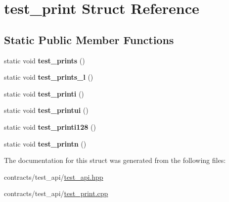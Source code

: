 \hypertarget{structtest__print}{}\section{test\+\_\+print Struct Reference}
\label{structtest__print}
\subsection*{Static Public Member Functions}
\begin{DoxyCompactItemize}
\item 
\mbox{\label{structtest__print_aa69968f94a66e14264afaa33d10fbd0e}} 
static void {\bfseries test\+\_\+prints} ()
\item 
\mbox{\label{structtest__print_af04966b7e8576254aa0cbb1d937a7c73}} 
static void {\bfseries test\+\_\+prints\+\_\+l} ()
\item 
\mbox{\label{structtest__print_a9e304b05c2dbc4df68602804e54a773a}} 
static void {\bfseries test\+\_\+printi} ()
\item 
\mbox{\label{structtest__print_a36ae19ddecc3f36b29ea206944f0f127}} 
static void {\bfseries test\+\_\+printui} ()
\item 
\mbox{\label{structtest__print_abcb55d27afec916e1432284eb6323205}} 
static void {\bfseries test\+\_\+printi128} ()
\item 
\mbox{\label{structtest__print_ab8e13806e7f706d7d08edf69504a71be}} 
static void {\bfseries test\+\_\+printn} ()
\end{DoxyCompactItemize}


The documentation for this struct was generated from the following files\+:\begin{DoxyCompactItemize}
\item 
contracts/test\+\_\+api/\mbox{\hyperlink{test__api_8hpp}{test\+\_\+api.\+hpp}}\item 
contracts/test\+\_\+api/\mbox{\hyperlink{test__print_8cpp}{test\+\_\+print.\+cpp}}\end{DoxyCompactItemize}
